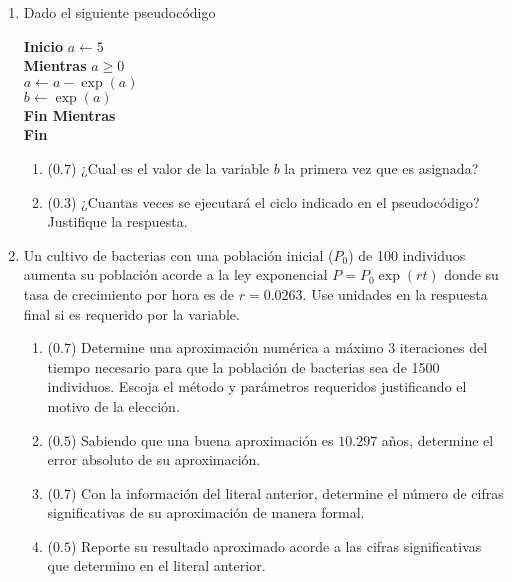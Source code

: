 \documentclass[12pt]{article}
\begin{document}
\vspace{-.5cm}
  \begin{enumerate}[leftmargin=*,widest=9]


    \item Dado el siguiente pseudocódigo

\textbf{Inicio}
\(a\gets 5\)\\
\textbf{Mientras} \(a \geq 0\)\\
\hspace*{1cm}\(a \gets a - \exp(a)\)\\
\hspace*{1cm}\(b \gets \exp(a) \)\\
\textbf{Fin Mientras}\\
\textbf{Fin}

\vspace{-0.5cm}

    \begin{enumerate}[label=\alph*]
    \item (\(0.7\)) ¿Cual es el valor de la variable \(b\) la primera vez que es asignada?
\vspace{1.5cm}
    \item (\(0.3\)) ¿Cuantas veces se ejecutará el ciclo indicado en el pseudocódigo? Justifique la respuesta.
\vspace{1.5cm}
    \end{enumerate}


    \item Un cultivo de bacterias con una población inicial (\(P_0\)) de 100 individuos aumenta su población acorde a la ley exponencial \(P = P_0\exp(rt)\) donde su tasa de crecimiento por hora es de \(r=0.0263\). Use unidades en la respuesta final si es requerido por la variable.

    \begin{enumerate}[label=\alph*]
    \item (\(0.7\)) Determine una aproximación numérica a máximo 3 iteraciones del tiempo necesario para que la población de bacterias sea de 1500 individuos. Escoja el método y parámetros requeridos justificando el motivo de la elección.
\vspace*{5cm}
    \item (\(0.5\)) Sabiendo que una buena aproximación es \(10.297\) años, determine el error absoluto de su aproximación.
\vspace{1cm}
    \item (\(0.7\)) Con la información del literal anterior, determine el número de cifras significativas de su aproximación de manera formal.
\vspace{3cm}
\item (\(0.5\)) Reporte su resultado aproximado acorde a las cifras significativas que determino en el literal anterior.
\vspace{0.5cm}
\end{enumerate}


\end{enumerate}
\end{document}
